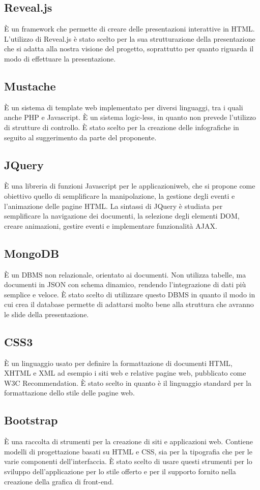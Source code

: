 \subsection{Reveal.js}
È un framework che permette di creare delle presentazioni interattive in HTML.
L'utilizzo di Reveal.js è stato scelto per la sua strutturazione della presentazione che si adatta alla nostra visione del progetto, soprattutto per quanto riguarda il modo di effettuare la presentazione.

\subsection{Mustache}
È un sistema di template web implementato per diversi linguaggi, tra i quali anche PHP e Javascript. È un sistema logic-less, in quanto non prevede l'utilizzo di strutture di controllo.
È stato scelto per la creazione delle infografiche in seguito al suggerimento da parte del proponente.

\subsection{JQuery}
È una libreria di funzioni Javascript per le applicazioniweb, che si propone come obiettivo quello di semplificare la manipolazione, la gestione degli eventi e l'animazione delle pagine HTML. La sintassi di JQuery è studiata per semplificare la navigazione dei documenti, la selezione degli elementi DOM, creare animazioni, gestire eventi e implementare funzionalità AJAX.

\subsection{MongoDB}
È un DBMS non relazionale, orientato ai documenti. Non utilizza tabelle, ma documenti in JSON con schema dinamico, rendendo l'integrazione di dati più semplice e veloce.
È stato scelto di utilizzare questo DBMS in quanto il modo in cui crea il database permette di adattarsi molto bene alla struttura che avranno le slide della presentazione.

\subsection{CSS3}
È un linguaggio usato per definire la formattazione di documenti HTML, XHTML e XML ad esempio i siti web e relative pagine web, pubblicato come W3C Recommendation.
È stato scelto in quanto è il linguaggio standard per la formattazione dello stile delle pagine web.

\subsection{Bootstrap}
È una raccolta di strumenti per la creazione di siti e applicazioni web. Contiene modelli di progettazione basati su HTML e CSS, sia per la tipografia che per le varie componenti dell'interfaccia.
È stato scelto di usare questi strumenti per lo sviluppo dell'applicazione per lo stile offerto e per il supporto fornito nella creazione della grafica di front-end.